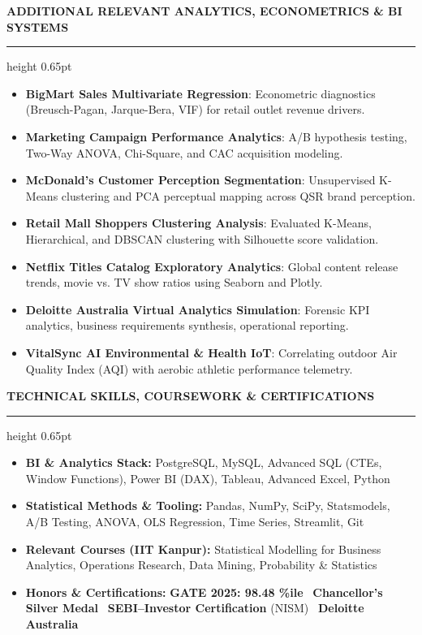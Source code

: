 \documentclass[10pt]{article}
\newcommand{\resumesection}[1]{%
  \vspace{2.5pt}%
  {\large \textbf{\uppercase{#1}}}%
  \vspace{1pt}%
  \hrule height 0.65pt%
  \vspace{2pt}%
}
\begin{document}
\resumesection{Additional Relevant Analytics, Econometrics \& BI Systems}

\begin{itemize}[noitemsep, topsep=1pt, partopsep=0pt, parsep=0pt]
    \item \textbf{BigMart Sales Multivariate Regression}: Econometric diagnostics (Breusch-Pagan, Jarque-Bera, VIF) for retail outlet revenue drivers.
    \item \textbf{Marketing Campaign Performance Analytics}: A/B hypothesis testing, Two-Way ANOVA, Chi-Square, and CAC acquisition modeling.
    \item \textbf{McDonald's Customer Perception Segmentation}: Unsupervised K-Means clustering and PCA perceptual mapping across QSR brand perception.
    \item \textbf{Retail Mall Shoppers Clustering Analysis}: Evaluated K-Means, Hierarchical, and DBSCAN clustering with Silhouette score validation.
    \item \textbf{Netflix Titles Catalog Exploratory Analytics}: Global content release trends, movie vs. TV show ratios using Seaborn and Plotly.
    \item \textbf{Deloitte Australia Virtual Analytics Simulation}: Forensic KPI analytics, business requirements synthesis, operational reporting.
    \item \textbf{VitalSync AI Environmental \& Health IoT}: Correlating outdoor Air Quality Index (AQI) with aerobic athletic performance telemetry.
\end{itemize}

\resumesection{Technical Skills, Coursework \& Certifications}

\begin{itemize}[noitemsep, topsep=1pt, partopsep=0pt, parsep=0pt]
    \item \textbf{BI \& Analytics Stack:} PostgreSQL, MySQL, Advanced SQL (CTEs, Window Functions), Power BI (DAX), Tableau, Advanced Excel, Python
    \item \textbf{Statistical Methods \& Tooling:} Pandas, NumPy, SciPy, Statsmodels, A/B Testing, ANOVA, OLS Regression, Time Series, Streamlit, Git
    \item \textbf{Relevant Courses (IIT Kanpur):} Statistical Modelling for Business Analytics, Operations Research, Data Mining, Probability \& Statistics
    \item \textbf{Honors \& Certifications:} \textbf{GATE 2025: 98.48 \%ile} \textbullet \ \textbf{Chancellor's Silver Medal} \textbullet \ \textbf{SEBI--Investor Certification} (NISM) \textbullet \ \textbf{Deloitte Australia}
\end{itemize}
\end{document}
